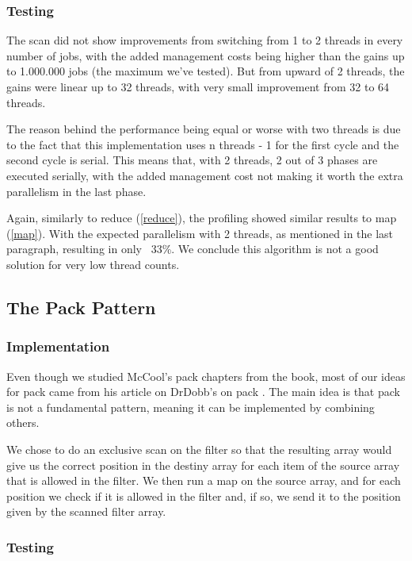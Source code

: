 \documentclass[9pt,journal]{IEEEtran}
\begin{document}
\subsubsection{Testing}

The scan did not show improvements from switching from 1 to 2 threads in every number of jobs, with the added management costs being higher than the gains up to 1.000.000 jobs (the maximum we've tested). But from upward of 2 threads, the gains were linear up to 32 threads, with very small improvement from 32 to 64 threads. 

The reason behind the performance being equal or worse with two threads is due to the fact that this implementation uses n threads - 1 for the first cycle and the second cycle is serial. This means that, with 2 threads, 2 out of 3 phases are executed serially, with the added management cost not making it worth the extra parallelism in the last phase.

Again, similarly to reduce (\ref{reduce}), the profiling showed similar results to map (\ref{map}). With the expected parallelism with 2 threads, as mentioned in the last paragraph, resulting in only ~33\%. We conclude this algorithm is not a good solution for very low thread counts.

\subsection{The Pack Pattern}
\subsubsection{Implementation}

Even though we studied McCool's pack chapters from the book, most of our ideas for pack came from his article on DrDobb's on pack \cite{dobbpack}. The main idea is that pack is not a fundamental pattern, meaning it can be implemented by combining others. 

We chose to do an exclusive scan on the filter so that the resulting array would give us the correct position in the destiny array for each item of the source array that is allowed in the filter. We then run a map on the source array, and for each position we check if it is allowed in the filter and, if so, we send it to the position given by the scanned filter array.

\subsubsection{Testing}
\end{document}
